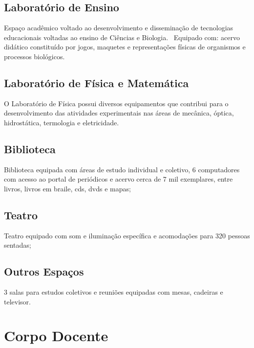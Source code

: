 \documentclass[
	10pt,				%
	openright,			%
	twoside,			%
	a4paper,			%
	english,			%
	french,				%
	brazil,				%
	sumario=tradicional
]{abntex2}
\begin{document}
\section*{Laboratório de Ensino}
Espaço acadêmico voltado ao desenvolvimento e disseminação de tecnologias educacionais voltadas ao ensino de Ciências e Biologia.  Equipado com: acervo didático constituído por jogos, maquetes e representações físicas de organismos e processos biológicos.

\section*{Laboratório de Física e Matemática}
O Laboratório de Física possui diversos equipamentos que contribui para o desenvolvimento das atividades experimentais nas áreas de mecânica, óptica, hidrostática, termologia e eletricidade.

\section*{Biblioteca}
Biblioteca equipada com áreas de estudo individual e coletivo, 6 computadores com acesso ao portal de periódicos e acervo cerca de 7 mil exemplares, entre livros, livros em braile, cds, dvds e mapas;

\section*{Teatro}
Teatro equipado com som e iluminação específica e acomodações para 320 pessoas sentadas;

\section*{Outros Espaços}
3 salas para estudos coletivos e reuniões equipadas com mesas, cadeiras e televisor.



\chapter{Corpo Docente}\label{docentes}

\end{document}
